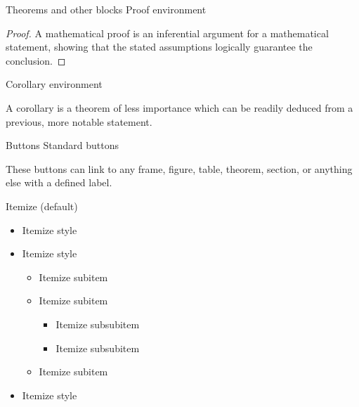 \documentclass[10pt,t]{beamer}
\begin{document}
\begin{frame}{Theorems and other blocks}
Proof environment
	\begin{proof}
	A mathematical proof is an inferential argument for a mathematical statement, showing that the stated assumptions logically guarantee the conclusion.
	\end{proof}
	
\vspace{11pt}	
Corollary environment
	\begin{corollary}
	A corollary is a theorem of less importance which can be readily deduced from a previous, more notable statement.
	\end{corollary}

\end{frame}






\begin{frame}{Buttons}
Standard buttons

	\hyperlink{colorpalette}{}


	\hyperlink{colorpalette}{\beamerreturnbutton{}}

\vspace{11pt}
These buttons can link to any frame, figure, table, theorem, section, or anything else with a defined label.
\end{frame}




\begin{frame}{Itemize}
(default)
\begin{itemize}
	\item Itemize style
	\item Itemize style
	\begin{itemize}
		\item Itemize subitem 
		\item Itemize subitem
			\begin{itemize}
				\item Itemize subsubitem
				\item Itemize subsubitem
			\end{itemize}
		\item Itemize subitem	
	\end{itemize}
	\item Itemize style
\end{itemize}
\end{frame}
\end{document}
